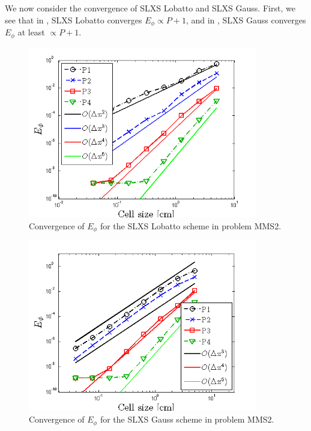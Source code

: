 We now consider the convergence of SLXS Lobatto and SLXS Gauss.  First, we see that in , SLXS Lobatto converges $E_{\phi} \propto P+1$, and in , SLXS Gauss converges $E_{\phi}$ at least $\propto P+1$.
\begin{figure}[!htp]
\centering
\includegraphics[width=10cm]{chapter6_grey_radtran/Dissertation_Data/MMS3_SLXS_Initial_SLXS_Lobatto_phi_L2.png}
\caption{Convergence of $E_{\phi}$ for the SLXS Lobatto scheme in problem MMS2.}
\label{fig:mms3_slxs_lobatto_e_phi}
\end{figure}
%
%
\begin{figure}[!hbp]
\centering
\includegraphics[width=10cm]{chapter6_grey_radtran/Dissertation_Data/MMS3_SLXS_Initial_SLXS_Gauss_phi_L2.png}
\caption{Convergence of $E_{\phi}$ for the SLXS Gauss scheme in problem MMS2.}
\label{fig:mms3_slxs_gauss_e_phi}
\end{figure}

